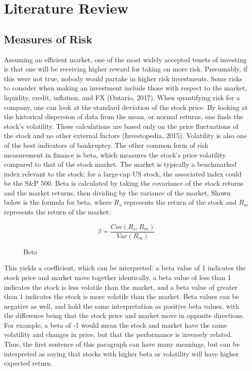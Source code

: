 \documentclass[12pt,twoside]{reedthesis}
\theoremstyle{definition}
\theoremstyle{definition}
\theoremstyle{definition}
\theoremstyle{remark}
\begin{document}
\chapter{Literature Review}\label{literature-review}

\section{Measures of Risk}\label{measures-of-risk}

Assuming an efficient market, one of the most widely accepted tenets of
investing is that one will be receiving higher reward for taking on more
risk. Presumably, if this were not true, nobody would partake in higher
risk investments. Some risks to consider when making an investment
include those with respect to the market, liquidity, credit, inflation,
and FX (Ontario, 2017). When quantifying risk for a company, one can
look at the standard deviation of the stock price. By looking at the
historical dispersion of data from the mean, or normal returns, one
finds the stock's volatility. These calculations are based only on the
price fluctuations of the stock and no other external factors
(Investopedia, 2015). Volatility is also one of the best indicators of
bankruptcy. The other common form of risk measurement in finance is
beta, which measures the stock's price volatility compared to that of
the stock market. The market is typically a benchmarked index relevant
to the stock; for a large-cap US stock, the associated index could be
the S\&P 500. Beta is calculated by taking the covariance of the stock
returns and the market returns, then dividing by the variance of the
market. Shown below is the formula for beta, where \(R_s\) represents
the return of the stock and \(R_m\) represents the return of the market:
\begin{figure}
$$ \beta = \frac{Cov(R_s, R_m)} {Var(R_m)}$$
\caption{Beta}
\end{figure}
This yields a coefficient, which can be interpreted: a beta value of 1
indicates the stock price and market move together identically, a beta
value of less than 1 indicates the stock is less volatile than the
market, and a beta value of greater than 1 indicates the stock is more
volatile than the market. Beta values can be negative as well, and hold
the same interpretation as positive beta values, with the difference
being that the stock price and market move in opposite directions. For
example, a beta of -1 would mean the stock and market have the same
volatility and changes in price, but that the performance is inversely
related. Thus, the first sentence of this paragraph can have many
meanings, but can be interpreted as saying that stocks with higher beta
or volatility will have higher expected return.
\end{document}
